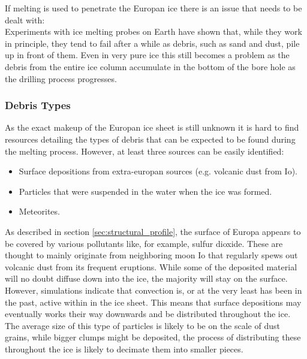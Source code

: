 If melting is used to penetrate the Europan ice there is an issue that needs to be dealt with:\\ Experiments with ice melting probes on Earth have shown that, while they work in principle, they tend to fail after a while as debris, such as sand and dust, pile up in front of them\cite{article:di1998a}. Even in very pure ice this still becomes a problem as the debris from the entire ice column accumulate in the bottom of the bore hole as the drilling process progresses. 

\subsubsection{Debris Types}
As the exact makeup of the Europan ice sheet is still unknown it is hard to find resources detailing the types of debris that can be expected to be found during the melting process. However, at least three sources can be easily identified:\\

\begin{itemize}
	\item Surface depositions from extra-europan sources (e.g. volcanic dust from Io).
	\item Particles that were suspended in the water when the ice was formed.
	\item Meteorites.
\end{itemize}

\noindent
As described in section \ref{sec:structural_profile}, the surface of Europa appears to be covered by various pollutants like, for example, sulfur dioxide. These are thought to mainly originate from neighboring moon Io that regularly spews out volcanic dust from its frequent eruptions. While some of the deposited material will no doubt diffuse down into the ice, the majority will stay on the surface. However, simulations indicate that convection is, or at the very least has been in the past, active within in the ice sheet\cite{article:barr2014a}. This means that surface depositions may eventually works their way downwards and be distributed throughout the ice. The average size of this type of particles is likely to be on the scale of dust grains, while bigger clumps might be deposited, the process of distributing these throughout the ice is likely to decimate them into smaller pieces. \\

